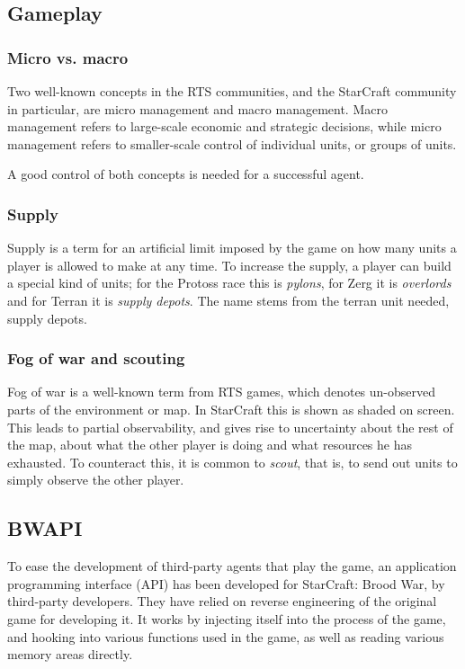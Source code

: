 \subsection{Gameplay}
\subsubsection{Micro vs. macro}
Two well-known concepts in the RTS communities, and the StarCraft community in particular, are micro management and macro management. Macro management refers to large-scale economic and strategic decisions, while micro management refers to smaller-scale control of individual units, or groups of units.

A good control of both concepts is needed for a successful agent.

\subsubsection{Supply}
Supply is a term for an artificial limit imposed by the game on how many units a player is allowed to make at any time. To increase the supply, a player can build a special kind of units; for the Protoss race this is {\em pylons}, for Zerg it is {\em overlords} and for Terran it is {\em supply depots}. The name stems from the terran unit needed, supply depots.

\subsubsection{Fog of war and scouting}
Fog of war is a well-known term from RTS games, which denotes un-observed parts of the environment or map. In StarCraft this is shown as shaded on screen. This leads to partial observability, and gives rise to uncertainty about the rest of the map, about what the other player is doing and what resources he has exhausted. To counteract this, it is common to {\em scout}, that is, to send out units to simply observe the other player.

\subsection{BWAPI}
To ease the development of third-party agents that play the game, an application programming interface (API) has been developed for StarCraft: Brood War, by third-party developers. They have relied on reverse engineering of the original game for developing it. It works by injecting itself into the process of the game, and hooking into various functions used in the game, as well as reading various memory areas directly.\cite{bwapi}

